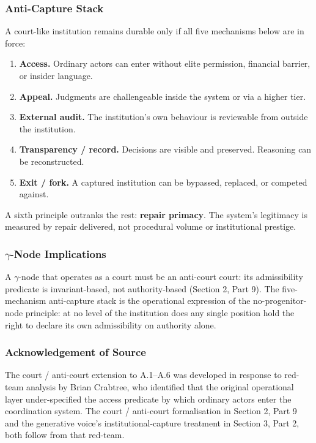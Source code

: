 \documentclass[
]{article}
\providecommand{\tightlist}{%
  \setlength{\itemsep}{0pt}\setlength{\parskip}{0pt}}
\begin{document}
\subsubsection*{Anti-Capture Stack}

A court-like institution remains durable only if all five
mechanisms below are in force:

\begin{enumerate}
\def\labelenumi{\arabic{enumi}.}
\tightlist
\item
  \textbf{Access.} Ordinary actors can enter without elite
  permission, financial barrier, or insider language.
\item
  \textbf{Appeal.} Judgments are challengeable inside the system
  or via a higher tier.
\item
  \textbf{External audit.} The institution's own behaviour is
  reviewable from outside the institution.
\item
  \textbf{Transparency / record.} Decisions are visible and
  preserved. Reasoning can be reconstructed.
\item
  \textbf{Exit / fork.} A captured institution can be bypassed,
  replaced, or competed against.
\end{enumerate}

A sixth principle outranks the rest: \textbf{repair primacy}. The
system's legitimacy is measured by repair delivered, not
procedural volume or institutional prestige.

\subsubsection*{\texorpdfstring{\(\gamma\)-Node Implications}{Gamma-Node
Implications}}

A \(\gamma\)-node that operates as a court must be an anti-court court:
its admissibility predicate is invariant-based, not authority-based
(Section 2, Part 9). The five-mechanism anti-capture stack is the
operational expression of the no-progenitor-node principle: at no
level of the institution does any single position hold the right
to declare its own admissibility on authority alone.

\subsubsection*{Acknowledgement of Source}

The court / anti-court extension to A.1--A.6 was developed in
response to red-team analysis by Brian Crabtree, who identified
that the original operational layer under-specified the access
predicate by which ordinary actors enter the coordination system.
The court / anti-court formalisation in Section 2, Part 9 and the
generative voice's institutional-capture treatment in Section 3,
Part 2, both follow from that red-team.
\end{document}
